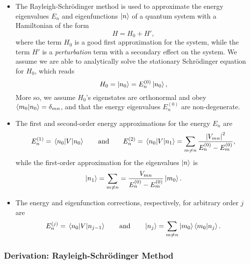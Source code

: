 \documentclass[11pt, a4paper]{article}
\newcommand{\Schro}{Schr\"{o}dinger\xspace}
\newcommand{\Ham}{Hamiltonian\xspace}
\begin{document}
\begin{itemize}
    \item The Rayleigh-\Schro method is used to approximate the energy eigenvalues $ E_{n} $ and eigenfunctions $ \ket{n} $ of a quantum system with a \Ham of the form 
    \begin{equation*}
        H = H_{0} + H',
    \end{equation*}
    where the term $ H_{0} $ is a good first approximation for the system, while the term $ H' $ is a \textit{perturbation} term with a secondary effect on the system. We assume we are able to analytically solve the stationary \Schro equation for $ H_{0} $, which reads
    \begin{equation*}
        H_{0} = \ket{n_{0}} = E_{n}^{(0)} \ket{n_{0}},
    \end{equation*}
    More so, we assume $ H_{0} $'s eigenstates are orthonormal and obey $ \braket{m_{0}}{n_{0}} = \delta_{mn} $, and that the energy eigenvalues $ E_{n}^{(0)} $ are non-degenerate. 

    \item The first and second-order energy approximations for the energy $ E_{n} $ are
    \begin{equation*}
        E_{n}^{(1)} = \mel{n_{0}}{V}{n_{0}} \qquad \text{and} \qquad E_{n}^{(2)} = \mel{n_{0}}{V}{n_{1}} = \sum_{m \neq n} \frac{\abs{V_{mn}}^{2}}{E_{n}^{(0)} - E_{m}^{(0)}},
    \end{equation*}
    while the first-order approximation for the eigenvalues $ \ket{n} $ is
    \begin{equation*}
        \ket{n_{1}} = \sum_{m\neq n} = \frac{V_{mn}}{E_{n}^{(0)} - E_{m}^{(0)}} \ket{m_{0}}.
    \end{equation*}
    
    \item The energy and eigenfunction corrections, respectively, for arbitrary order $ j $ are
    \begin{equation*}
        E_{n}^{(j)} = \mel{n_{0}}{V}{n_{j-1}} \qquad \text{and} \qquad \ket{n_{j}} = \sum_{m \neq n}\ket{m_{0}}\braket{m_{0}}{n_{j}}.
    \end{equation*}

\end{itemize}

\subsubsection{Derivation: Rayleigh-\Schro Method}
\end{document}
